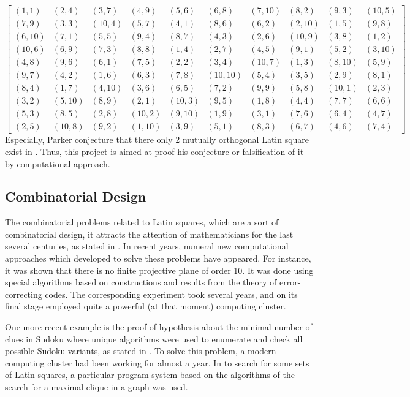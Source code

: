 \documentclass[12pt]{article}
\begin{document}
\[ \begin{bmatrix}(1,1)&(2,4)&(3,7)&(4,9)&(5,6)&(6,8)&(7,10)&(8,2)&(9,3)&(10,5)\\
                  (7,9)&(3,3)&(10,4)&(5,7)&(4,1)&(8,6)&(6,2)&(2,10)&(1,5)&(9,8)\\
                  (6,10)&(7,1)&(5,5)&(9,4)&(8,7)&(4,3)&(2,6)&(10,9)&(3,8)&(1,2)\\
                  (10,6)&(6,9)&(7,3)&(8,8)&(1,4)&(2,7)&(4,5)&(9,1)&(5,2)&(3,10)\\
                  (4,8)&(9,6)&(6,1)&(7,5)&(2,2)&(3,4)&(10,7)&(1,3)&(8,10)&(5,9)\\
                  (9,7)&(4,2)&(1,6)&(6,3)&(7,8)&(10,10)&(5,4)&(3,5)&(2,9)&(8,1)\\
                  (8,4)&(1,7)&(4,10)&(3,6)&(6,5)&(7,2)&(9,9)&(5,8)&(10,1)&(2,3)\\
                  (3,2)&(5,10)&(8,9)&(2,1)&(10,3)&(9,5)&(1,8)&(4,4)&(7,7)&(6,6)\\
                  (5,3)&(8,5)&(2,8)&(10,2)&(9,10)&(1,9)&(3,1)&(7,6)&(6,4)&(4,7)\\ 
                  (2,5)&(10,8)&(9,2)&(1,10)&(3,9)&(5,1)&(8,3)&(6,7)&(4,6)&(7,4)\end{bmatrix} \]
Especially, Parker conjecture that there only 2 mutually orthogonal Latin square exist in \cite{ref13}. Thus, this project is aimed at proof his conjecture or falsification of it by computational approach.

\subsection{Combinatorial Design}

The combinatorial problems related to Latin squares, which are a sort of combinatorial design, it attracts the attention of mathematicians for the last several centuries, as stated in \cite{ref14}. In recent years, numeral new computational approaches which developed to solve these problems have appeared. For instance, it was shown that there is no finite projective plane of order 10. It was done using special algorithms based on constructions and results from the theory of error-correcting codes. The corresponding experiment took several years, and on its final stage employed quite a powerful (at that moment) computing cluster.

One more recent example is the proof of hypothesis about the minimal number of clues in Sudoku where unique algorithms were used to enumerate and check all possible Sudoku variants, as stated in \cite{ref14}. To solve this problem, a modern computing cluster had been working for almost a year. In to search for some sets of Latin squares, a particular program system based on the algorithms of the search for a maximal clique in a graph was used.
\end{document}
